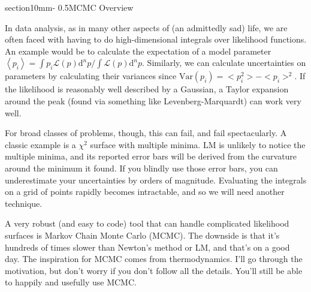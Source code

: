 \documentclass[letterpaper,11pt,preprint]{aastex}
\makeatletter
\renewcommand{\section}{\@startsection%
{section}{1}{0mm}{-\baselineskip}%
{0.5\baselineskip}{\normalfont\Large\bfseries}}%
\makeatother
\begin{document}
\pagestyle{plain}

\section{MCMC Overview}

In data analysis, as in many other aspects of (an admittedly sad)
life, we are often faced with having to do high-dimensional integrals
over likelihood functions.  An example would be to calculate the
expectation of a model parameter $\left < p_i \right > = \int p_i \mathcal{L}(p)
\mathrm{d}^np/ \int \mathcal{L}(p) \mathrm{d}^np$.  Similarly, we can
calculate uncertainties on parameters by calculating their variances
since $\mathrm{Var}(p_i) = <p_i^2> - <p_i>^2$.    
If the likelihood is reasonably well described by a Gaussian, a Taylor
expansion around the peak (found via something like
Levenberg-Marquardt)
can work very well.  

For broad classes of
problems, though, this can fail, and fail spectacularly.  A classic
example is a $\chi^2$ surface with multiple minima.  LM is unlikely to
notice the multiple minima, and its reported error bars will be
derived from the curvature around the minimum it found. If you blindly
use those error bars, you can underestimate your uncertainties by
orders of magnitude.  Evaluating the integrals on a grid of points
rapidly becomes intractable, and so we will need another technique.

A very robust (and easy to code) tool that can handle complicated
likelihood surfaces is Markov Chain Monte Carlo (MCMC).  The downside
is that it's hundreds of times slower than Newton's method or LM, and
that's on a good day. The inspiration for MCMC comes from
thermodynamics.  I'll go through the motivation, but don't worry if
you don't follow all the details.  You'll still be able to happily and
usefully use MCMC.
\end{document}
